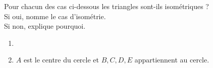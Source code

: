 %
%
    Pour chacun des cas ci-dessous les triangles sont-ils isométriques ?\\
    Si oui, nomme le cas d'isométrie.\\
    Si non, explique pourquoi.\\
    \begin{enumerate}[cols=2]
        \item 
        \item $A$ est le centre du cercle et $B,C,D,E$ appartiennent au cercle.\\
    \end{enumerate}
